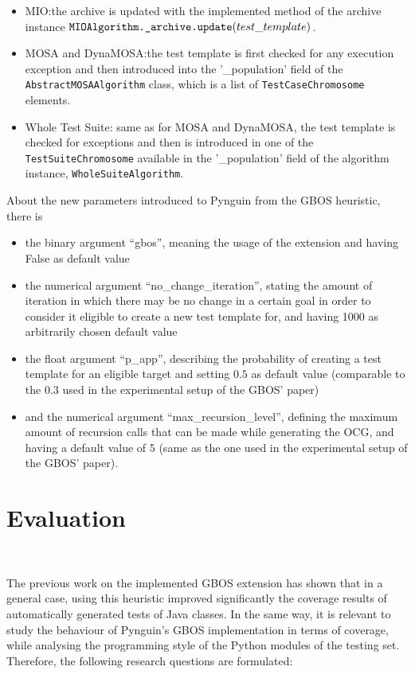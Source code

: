 \documentclass[%
  chapterprefix=false,%
  open=right,%
  twoside=true,%
  paper=a4,%
  logofile={Figures/logo.png},%
  thesistype=master,%
  UKenglish,%
]{se2thesis}
\newcommand{\classname}[1]{\texttt{#1}}
\newcommand{\callable}[2][]{\(\text{\texttt{#2}}(#1)\)}
\begin{document}
\begin{itemize}
  \item MIO:\@ the archive is updated with the implemented method of the archive instance \callable[test\_template]{MIOAlgorithm.\_archive.update}.
  \item MOSA and DynaMOSA:\@ the test template is first checked for any execution exception and then introduced into the '\_population' field of the \classname{AbstractMOSAAlgorithm} class, which is a list of \classname{TestCaseChromosome} elements.
  \item Whole Test Suite: same as for MOSA and DynaMOSA, the test template is checked for exceptions and then is introduced in one of the \classname{TestSuiteChromosome} available in the '\_population' field of the algorithm instance, \classname{WholeSuiteAlgorithm}.
\end{itemize}

About the new parameters introduced to Pynguin from the GBOS heuristic, there is
\begin{itemize}
  \item the binary argument ``gbos'', meaning the usage of the extension and having False as default value
  \item the numerical argument ``no\_change\_iteration'', stating the amount of iteration in which there may be no change in a certain goal in order to consider it eligible to create a new test template for, and having 1000 as arbitrarily chosen default value
  \item the float argument ``p\_app'', describing the probability of creating a test template for an eligible target and setting \(0.5\) as default value (comparable to the \(0.3\) used in the experimental setup of the GBOS' paper)
  \item and the numerical argument ``max\_recursion\_level'', defining the maximum amount of recursion calls that can be made while generating the OCG, and having a default value of 5 (same as the one used in the experimental setup of the GBOS' paper).
\end{itemize}

\chapter{Evaluation}~\label{chap:evaluation}

The previous work on the implemented GBOS extension has shown that in a general case, using this heuristic improved significantly the coverage results of automatically generated tests of Java classes.
In the same way, it is relevant to study the behaviour of Pynguin's GBOS implementation in terms of coverage, while analysing the programming style of the Python modules of the testing set.
Therefore, the following research questions are formulated:
\end{document}
